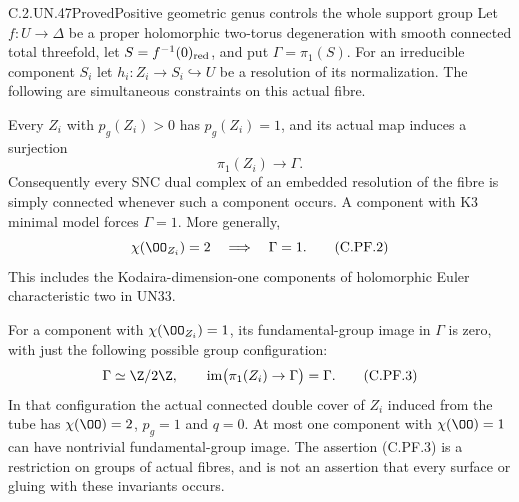 \begin{statement}{C.2.UN.47}{Proved}{Positive geometric genus controls the whole support group}
Let $f:U\to\Delta$ be a proper holomorphic two-torus degeneration
with smooth connected total threefold, let $S=f^{-1}(0)_{\rm red}$,
and put $\Gamma=\pi_1(S)$. For an irreducible component $S_i$ let
$h_i:Z_i\to S_i\hookrightarrow U$ be a resolution of its normalization.
The following are simultaneous constraints on this actual fibre.

Every $Z_i$ with $p_g(Z_i)>0$ has $p_g(Z_i)=1$, and its actual
map induces a surjection
\[
                         \pi_1(Z_i)\longrightarrow\Gamma .
                                                        \tag{C.PF.1}
\]
Consequently every SNC dual complex of an embedded resolution of
the fibre is simply connected whenever such a component occurs.
A component with K3 minimal model forces $\Gamma=1$.
More generally,
\[
                    \chi(\OO_{Z_i})=2
                         \quad\Longrightarrow\quad\Gamma=1 .
                                                        \tag{C.PF.2}
\]
This includes the Kodaira-dimension-one components of holomorphic
Euler characteristic two in UN33.

For a component with $\chi(\OO_{Z_i})=1$, its fundamental-group
image in $\Gamma$ is zero, with just the following possible
group configuration:
\[
 \Gamma\simeq\Z/2\Z,\qquad
 \operatorname{im}\bigl(\pi_1(Z_i)\to\Gamma\bigr)=\Gamma .
                                                        \tag{C.PF.3}
\]
In that configuration the actual connected double cover of $Z_i$
induced from the tube has
$\chi(\OO)=2$, $p_g=1$ and $q=0$. At most one component with
$\chi(\OO)=1$ can have nontrivial fundamental-group image.
The assertion (C.PF.3) is a restriction on groups of actual fibres,
and is not an assertion that every surface or gluing with these
invariants occurs.
\end{statement}

